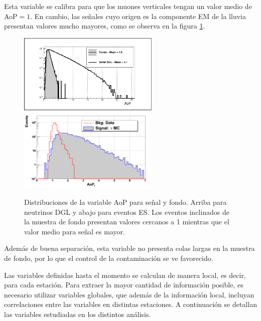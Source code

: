 \begin{itemize}
\begin{figure}[ht!]
	 \end{figure}
	 Esta variable se calibra para que los muones verticales tengan un valor medio de AoP$=1$.
	 En cambio, las señales cuyo origen es la componente EM de la lluvia presentan valores mucho mayores, como se observa en la figura \ref{fig:aopDist}.
	 \begin{figure}[ht!]
		\begin{center}
		\includegraphics[width=0.6\textwidth]{fig/seleccionAuger/aopDGL} \\
		\includegraphics[width=0.6\textwidth]{fig/seleccionAuger/aop_forThesis}
		\caption{Distribuciones de la variable AoP para señal y fondo. Arriba para neutrinos DGL y abajo para eventos ES. Los eventos inclinados de la muestra de fondo presentan valores cercanos a 1 mientras que el valor medio para señal es mayor.}
		\label{fig:aopDist}
		\end{center}
	 \end{figure}
	 Además de buena separación, esta variable no presenta colas largas en la muestra de fondo, por lo que el control de la contaminación se ve favorecido.
	\end{itemize}
	
	Las variables definidas hasta el momento se calculan de manera local, es decir, para cada estación.
	Para extraer la mayor cantidad de información posible, es necesario utilizar variables globales, que además de la información local, incluyan correlaciones entre las variables en distintas estaciones.
	A continuación se detallan las variables estudiadas en los distintos análisis.
	
